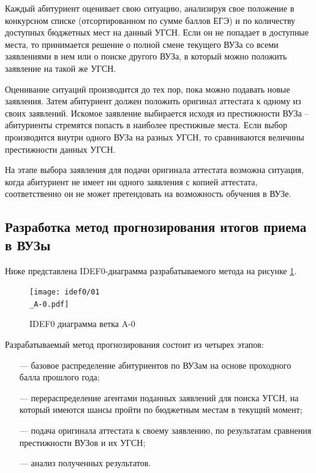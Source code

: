 Каждый абитуриент оценивает свою ситуацию, анализируя свое положение в конкурсном списке (отсортированном по сумме баллов ЕГЭ) и по количеству доступных бюджетных мест на данный УГСН. Если он не попадает в доступные места, то принимается решение о полной смене текущего ВУЗа со всеми заявлениями в нем или о поиске другого ВУЗа, в который можно положить заявление на такой же УГСН.

Оценивание ситуаций производится до тех пор, пока можно подавать новые заявления. Затем абитуриент должен положить оригинал аттестата к одному из своих заявлений. Искомое заявление выбирается исходя из престижности ВУЗа – абитуриенты стремятся попасть в наиболее престижные места. Если выбор производится внутри одного ВУЗа на разных УГСН, то сравниваются величины престижности данных УГСН. 

На этапе выбора заявления для подачи оригинала аттестата возможна ситуация, когда абитуриент не имеет ни одного заявления с копией аттестата, соответственно он не может претендовать на возможность обучения в ВУЗе.

\subsection{Разработка метод прогнозирования итогов приема в ВУЗы}

Ниже представлена IDEF0-диаграмма разрабатываемого метода на рисунке  \ref{A-0}.

\begin{figure}[hbtp]
	\centering
	\texttt{[image: idef0/01\\\_A-0.pdf]}
	\caption{IDEF0 диаграмма ветка A-0}
	\label{A-0}
\end{figure}

Разрабатываемый метод прогнозирования состоит из четырех этапов:

\begin{itemize}[leftmargin=1.6\parindent]
	\item[---] базовое распределение абитуриентов по ВУЗам на основе проходного балла прошлого года;
	\item[---] перераспределение агентами поданных заявлений для поиска УГСН, на который имеются шансы пройти по бюджетным местам в текущий момент;
	\item[---] подача оригинала аттестата к своему заявлению, по результатам сравнения престижности ВУЗов и их УГСН;
	\item[---] анализ полученных результатов.
\end{itemize}

